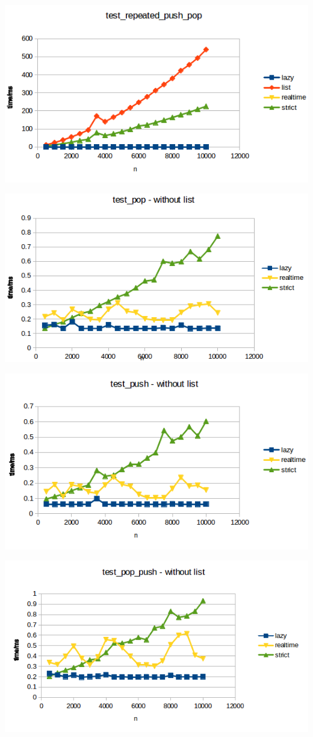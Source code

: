 \includegraphics{Graphs/test_repeated_push_pop.png}


\includegraphics{Graphs/test_pop_without_list.png}


\includegraphics{Graphs/test_push_without_list.png}


\includegraphics{Graphs/test_pop_push_without_list.png}


